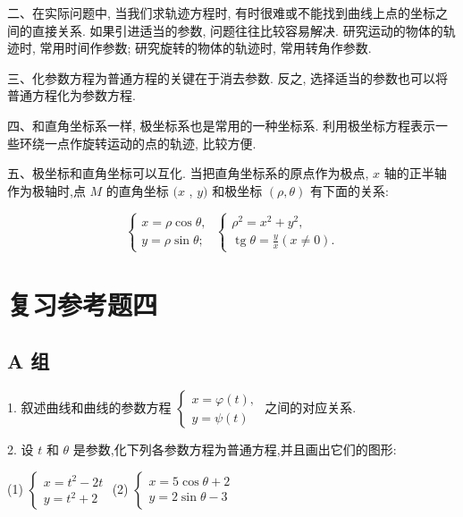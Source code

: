 \documentclass[lang=cn,newtx,10pt,scheme=chinese]{elegantbook}
\begin{document}
二、在实际问题中, 当我们求轨迹方程时, 有时很难或不能找到曲线上点的坐标之间的直接关系. 如果引进适当的参数, 问题往往比较容易解决. 研究运动的物体的轨迹时, 常用时间作参数; 研究旋转的物体的轨迹时, 常用转角作参数.

三、化参数方程为普通方程的关键在于消去参数. 反之, 选择适当的参数也可以将普通方程化为参数方程.

四、和直角坐标系一样, 极坐标系也是常用的一种坐标系. 利用极坐标方程表示一些环绕一点作旋转运动的点的轨迹, 比较方便.

五、极坐标和直角坐标可以互化. 当把直角坐标系的原点作为极点, \(x\) 轴的正半轴作为极轴时,点 \(M\) 的直角坐标 \((x\) , \(y)\) 和极坐标 \(\left( {\rho ,\theta }\right)\) 有下面的关系:

\[
  \left\{ {\begin{array}{l} x = \rho \cos \theta , \\ y = \rho \sin \theta ; \end{array}\;\left\{ \begin{array}{l} {\rho }^{2} = {x}^{2} + {y}^{2}, \\ \operatorname{tg}\theta = \frac{y}{x}\left( {x \neq 0}\right) . \end{array}\right. }\right.
\]

\chapter*{复习参考题四}

\section*{A 组}

1. 叙述曲线和曲线的参数方程 \(\left\{ \begin{array}{l} x = \varphi \left( t\right) , \\ y = \psi \left( t\right) \end{array}\right.\) 之间的对应关系.

2. 设 \(t\) 和 \(\theta\) 是参数,化下列各参数方程为普通方程,并且画出它们的图形:

(1) \(\left\{ \begin{array}{l} x = {t}^{2} - {2t} \\ y = {t}^{2} + 2 \end{array}\right.\) (2) \(\left\{ \begin{array}{l} x = 5\cos \theta + 2 \\ y = 2\sin \theta - 3 \end{array}\right.\)
\end{document}
